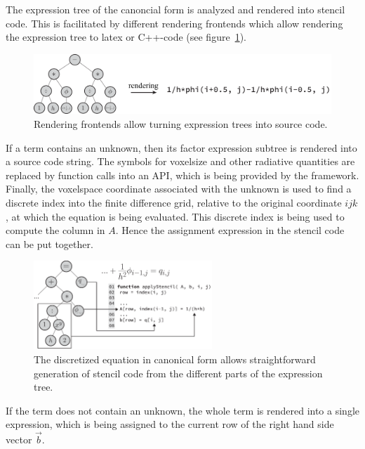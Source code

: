 The expression tree of the canoncial form is analyzed and rendered into stencil code. This is facilitated by different rendering frontends which allow rendering the expression tree to latex or C++-code (see figure~\ref{fig:pn_math_expression_tree_rendering}).
\begin{figure}[h]
\centering
\includegraphics[width=1.0\textwidth]{04_pn_method/figures/fig_car_rendering.pdf}
\caption{Rendering frontends allow turning expression trees into source code.}
\label{fig:pn_math_expression_tree_rendering}
\end{figure}

If a term contains an unknown, then its factor expression subtree is rendered into a source code string. The symbols for voxelsize and other radiative quantities are replaced by function calls into an API, which is being provided by the framework. Finally, the voxelspace coordinate associated with the unknown is used to find a discrete index into the finite difference grid, relative to the original coordinate $ijk$, at which the equation is being evaluated. This discrete index is being used to compute the column in $A$. Hence the assignment expression in the stencil code can be put together.
\begin{figure}[h]
\centering
\includegraphics[width=0.6\textwidth]{04_pn_method/figures/fig_car_canonical_to_code.pdf}
\caption{The discretized equation in canonical form allows straightforward generation of stencil code from the different parts of the expression tree.}
\label{fig:pn_discretization_codegen}
\end{figure}

If the term does not contain an unknown, the whole term is rendered into a single expression, which is being assigned to the current row of the right hand side vector $\vec{b}$.

